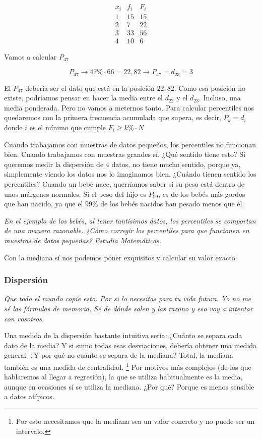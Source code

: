 \[
\begin{array}{c|c|c}
x_i & f_i&F_i\\\hline
1&15&15\\
2&7&22\\
3&33&56\\
4&10&6
\end{array}
\]

Vamos a calcular $P_{47}$

\[
P_{47} \to 47\% · 66 = 22,82 \to P_{47} = d_{23} = 3
\]

El $P_{47}$ debería ser el dato que está en la posición $22,82$. Como esa posición no existe, podríamos pensar en hacer la media entre el $d_{22}$ y el $d_{23}$. Incluso, una media ponderada. Pero no vamos a meternos tanto. 
%
Para calcular percentiles nos quedaremos con la primera frecuencia acumulada que supera, es decir, $\displaystyle P_k = d_{i}$ donde $i$ es el mínimo que cumple $F_i\geq k\%·N$

Cuando trabajamos con muestras de datos pequeños, los percentiles no funcionan bien. Cuando trabajamos con muestras grandes sí. ¿Qué sentido tiene esto? 
%
Si queremos medir la dispersión de 4 datos, no tiene mucho sentido, porque ya, simplemente viendo los datos nos lo imaginamos bien. 
%
¿Cuándo tienen sentido los percentiles? 
%
Cuando un bebé nace, querríamos saber si su peso está dentro de unos márgenes normales. 
%
Si el peso del hijo es $P_{99}$, es de los bebés más gordos que han nacido, ya que el $99\%$ de los bebés nacidos han pesado menos que él. 

\textit{En el ejemplo de los bebés, al tener tantísimos datos, los percentiles se comportan de una manera razonable. ¿Cómo corregir los percentiles para que funcionen en muestras de datos pequeñas? Estudia Matemáticas.}

\obs Con la mediana sí nos podemos poner exquisitos y calcular su valor exacto.

\subsubsection{Dispersión}

\textit{Que todo el mundo copie esto. Por si lo necesitas para tu vida futura. Yo no me sé las fórmulas de memoria. Sé de dónde salen y las razono y eso voy a intentar con vosotros.}

\begin{defn}[Rango]
\end{defn}

Una medida de la dispersión bastante intuitiva sería: ¿Cuánto se separa cada dato de la media? Y si sumo todas esas desviaciones, debería obtener una medida general. ¿Y por qué no cuánto se separa de la mediana? Total, la mediana también es una medida de centralidad. \footnote{Por esto necesitamos que la mediana sea un valor concreto y no puede ser un intervalo.}
%
Por motivos más complejos (de los que hablaremos al llegar a regresión), la que se utiliza habitualmente es la media, aunque en ocasiones sí se utiliza la mediana. ¿Por qué? Porque es menos sensible a datos atípicos.

